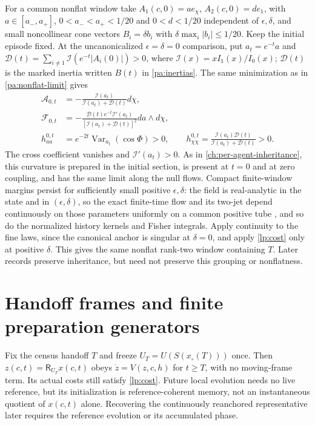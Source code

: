 For a common nonflat window take $A_1(c,0)=ae_\chi$, $A_2(c,0)=de_1$, with $a\in[a_-,a_+]$, $0<a_-<a_+<1/20$ and $0<d<1/20$ independent of $\epsilon,\delta$, and small noncollinear cone vectors $B_i=\delta b_i$ with $\delta\max_i|b_i|\leq1/20$. Keep the initial episode fixed. At the uncanonicalized $\epsilon=\delta=0$ comparison, put $a_t=e^{-t}a$ and $\mathcal D(t)=\sum_{i\ne1}\mathcal I(e^{-t}|A_i(0)|)>0$, where $\mathcal I(x)=xI_1(x)/I_0(x)$; $\mathcal D(t)$ is the marked inertia written $B(t)$ in \cref{pa:inertias}. The same minimization as in \cref{pa:nonflat-limit} gives
\begin{equation}
 \begin{aligned}
 \mathcal A_{0,t}&=-\frac{\mathcal I(a_t)}{\mathcal I(a_t)+\mathcal D(t)}d\chi,\\
 \mathcal F_{0,t}&=-\frac{\mathcal D(t)e^{-t}\mathcal I'(a_t)}{[\mathcal I(a_t)+\mathcal D(t)]^2}da\wedge d\chi,\\
 h_{aa}^{0,t}&=e^{-2t}\operatorname{Var}_{a_t}(\cos\Phi)>0,\qquad
 h_{\chi\chi}^{0,t}=\frac{\mathcal I(a_t)\mathcal D(t)}{\mathcal I(a_t)+\mathcal D(t)}>0.
 \end{aligned}
 \label{lp:nonflat}
\end{equation}
The cross coefficient vanishes and $\mathcal I'(a_t)>0$. As in \cref{ch:per-agent-inheritance}, this curvature is prepared in the initial section, is present at $t=0$ and at zero coupling, and has the same limit along the null flows. Compact finite-window margins persist for sufficiently small positive $\epsilon,\delta$: the field is real-analytic in the state and in $(\epsilon,\delta)$, so the exact finite-time flow and its two-jet depend continuously on those parameters uniformly on a common positive tube \citep[Chapter V]{Hartman2002}, and so do the normalized history kernels and Fisher integrals. Apply continuity to the fine laws, since the canonical anchor is singular at $\delta=0$, and apply \cref{lp:cost} only at positive $\delta$. This gives the same nonflat rank-two window containing $T$. Later records preserve inheritance, but need not preserve this grouping or nonflatness.

\section{Handoff frames and finite preparation generators}

Fix the census handoff $T$ and freeze $U_T=U(S(x_\circ(T)))$ once. Then $z(c,t)=\mathsf R_{U_T}x(c,t)$ obeys $\dot z=V(z,c,h)$ for $t\ge T$, with no moving-frame term. Its actual costs still satisfy \cref{lp:cost}. Future local evolution needs no live reference, but its initialization is reference-coherent memory, not an instantaneous quotient of $x(c,t)$ alone. Recovering the continuously reanchored representative later requires the reference evolution or its accumulated phase.

